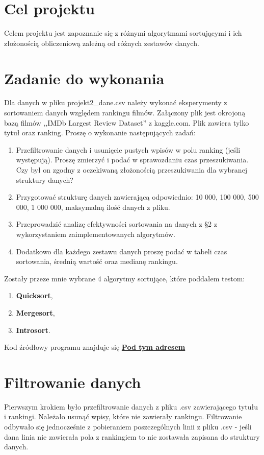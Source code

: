 \documentclass[12pt]{article}
\begin{document}

    
\tableofcontents
\newpage
\section{Cel projektu}
Celem projektu jest zapoznanie się z różnymi algorytmami sortującymi i ich złożonością obliczeniową zależną od różnych zestawów danych. 
\section{Zadanie do wykonania}
Dla danych w pliku projekt2\_dane.csv należy wykonać eksperymenty z sortowaniem danych względem
rankingu filmów. Załączony plik jest okrojoną bazą filmów ,,IMDb Largest Review Dataset'' z kaggle.com.
Plik zawiera tylko tytuł oraz ranking. Proszę o wykonanie następujących zadań:
\begin{enumerate}
    \item Przefiltrowanie danych i usunięcie pustych wpisów w polu ranking (jeśli występują). Proszę zmierzyć
    i podać w sprawozdaniu czas przeszukiwania. Czy był on zgodny z oczekiwaną złożonością przeszukiwania
    dla wybranej struktury danych?
    \item Przygotować strukturę danych zawierającą odpowiednio: 10 000, 100 000, 500 000, 1 000 000,
    maksymalną ilość danych z pliku.
    \item Przeprowadzić analizę efektywności sortowania na danych z §2 z wykorzystaniem zaimplementowanych
    algorytmów. 
    \item  Dodatkowo dla każdego zestawu danych proszę podać w tabeli czas sortowania, średnią wartość
    oraz medianę rankingu.
    
\end{enumerate}
Zostały przeze mnie wybrane 4 algorytmy sortujące, które poddałem testom:

\begin{enumerate}
    \item \textbf{Quicksort},
    \item \textbf{Mergesort},
    \item \textbf{Introsort}.
\end{enumerate}

Kod źródłowy programu znajduje się \href{https://github.com/PartyKusZ/PAMSI/tree/main/projekt_2-maj/src}{\textbf{Pod tym adresem}}
\section{Filtrowanie danych}\label{ch: filtorwanie}
Pierwszym krokiem było przefiltrowanie danych z pliku .csv zawierającego tytułu i rankingi. Należało usunąć wpisy, 
które nie zawierały rankingu. Filtrowanie odbywało się jednocześnie z pobieraniem poszczególnych linii z pliku .csv - jeśli dana 
linia nie zawierała pola z rankingiem to nie zostawała zapisana do struktury danych. 
\end{document}
